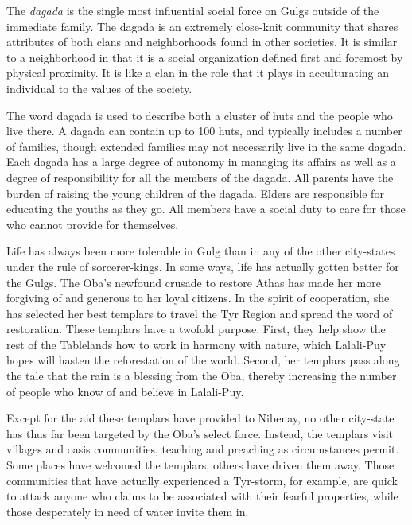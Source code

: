 {
	The \emph{dagada} is the single most influential social force on Gulgs outside of the immediate family. The dagada is an extremely close-knit community that shares attributes of both clans and neighborhoods found in other societies. It is similar to a neighborhood in that it is a social organization defined first and foremost by physical proximity. It is like a clan in the role that it plays in acculturating an individual to the values of the society.

	The word dagada is used to describe both a cluster of huts and the people who live there. A dagada can contain up to 100 huts, and typically includes a number of families, though extended families may not necessarily live in the same dagada. Each dagada has a large degree of autonomy in managing its affairs as well as a degree of responsibility for all the members of the dagada. All parents have the burden of raising the young children of the dagada. Elders are responsible for educating the youths as they go. All members have a social duty to care for those who cannot provide for themselves.

	Life has always been more tolerable in Gulg than in any of the other city-states under the rule of sorcerer-kings. In some ways, life has actually gotten better for the Gulgs. The Oba's newfound crusade to restore Athas has made her more forgiving of and generous to her loyal citizens. In the spirit of cooperation, she has selected her best templars to travel the Tyr Region and spread the word of restoration. These templars have a twofold purpose. First, they help show the rest of the Tablelands how to work in harmony with nature, which Lalali-Puy hopes will hasten the reforestation of the world. Second, her templars pass along the tale that the rain is a blessing from the Oba, thereby increasing the number of people who know of and believe in Lalali-Puy.

	Except for the aid these templars have provided to Nibenay, no other city-state has thus far been targeted by the Oba's select force. Instead, the templars visit villages and oasis communities, teaching and preaching as circumstances permit. Some places have welcomed the templars, others have driven them away. Those communities that have actually experienced a Tyr-storm, for example, are quick to attack anyone who claims to be associated with their fearful properties, while those desperately in need of water invite them in.
}
